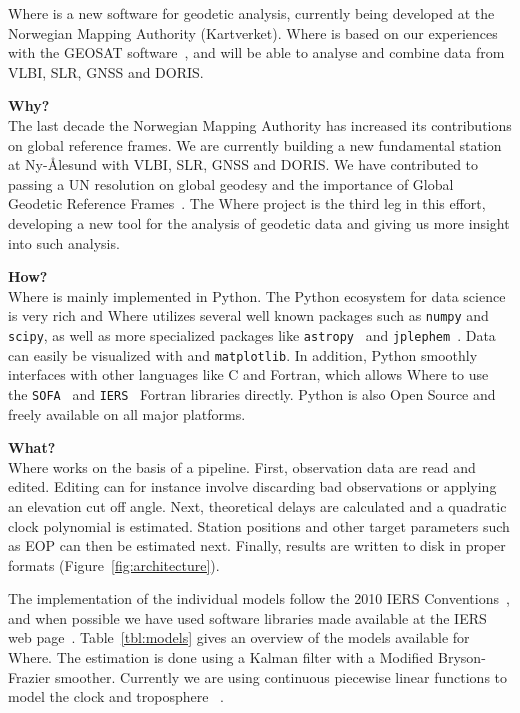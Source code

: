 Where is a new software for geodetic analysis, currently being developed at the
Norwegian Mapping Authority (Kartverket). Where is based on our experiences with
the GEOSAT software~\cite{kierulf2010}, and will be able to analyse and combine
data from VLBI, SLR, GNSS and DORIS.


{\large\bfseries Why?}\\

The last decade the Norwegian Mapping Authority has increased its contributions
on global reference frames.  We are currently building a new fundamental station
at Ny-{\AA}lesund with VLBI, SLR, GNSS and DORIS. We have contributed to passing
a UN resolution on global geodesy and the importance of Global Geodetic
Reference Frames~\cite{un_ggrf}. The Where project is the third leg in this
effort, developing a new tool for the analysis of geodetic data and giving us
more insight into such analysis.


{\large\bfseries How?}\\

Where is mainly implemented in Python. The Python ecosystem for data science is
very rich and Where utilizes several well known packages such as \texttt{numpy}
and \texttt{scipy}, as well as more specialized packages
like \texttt{astropy}~\cite{astropy2013}
and \texttt{jplephem}~\cite{jplephem}. Data can easily be visualized with
and \texttt{matplotlib}. In addition, Python smoothly interfaces with other
languages like C and Fortran, which allows Where to use
the \texttt{SOFA}~\cite{sofa_software} and \texttt{IERS}~\cite{iers_software}
Fortran libraries directly. Python is also Open Source and freely available on
all major platforms.


{\large\bfseries What?}\\

Where works on the basis of a pipeline. First, observation data are read and
edited. Editing can for instance involve discarding bad observations or applying
an elevation cut off angle. Next, theoretical delays are calculated and a
quadratic clock polynomial is estimated. Station positions and other target
parameters such as EOP can then be estimated next. Finally, results are written
to disk in proper formats (Figure~\ref{fig:architecture}).

The implementation of the individual models follow the 2010 IERS
Conventions~\cite{iers2010}, and when possible we have used software libraries
made available at the IERS web page~\cite{iers_software}. Table~\ref{tbl:models}
gives an overview of the models available for Where. The estimation is done
using a Kalman filter with a Modified Bryson-Frazier smoother. Currently we are
using continuous piecewise linear functions to model the clock and troposphere
~\cite{mysen2017b}.


